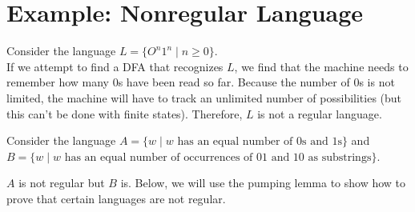 \documentclass[11pt,a4paper]{article}
\begin{document}
\tableofcontents


\section{Example: Nonregular Language}
\begin{example}
    Consider the language $L=\{O^n1^n\mid n\geq 0\}$. \\

    If we attempt to find a DFA that recognizes $L$, we find that the machine needs to remember how many 0s have been read so far.
    Because the number of 0s is not limited, the machine will have to track an unlimited number of possibilities (but this can't be done with finite states).
    Therefore, $L$ is not a regular language.
\end{example}

\begin{example}
    Consider the language $A=\{w\mid w\text{ has an equal number of 0s and 1s}\}$ and $B=\{w\mid w\text{ has an equal number of occurrences of 01 and 10 as substrings}\}$.

    $A$ is not regular but $B$ is. Below, we will use the pumping lemma to show how to prove that certain languages are not regular.
\end{example}
\end{document}
